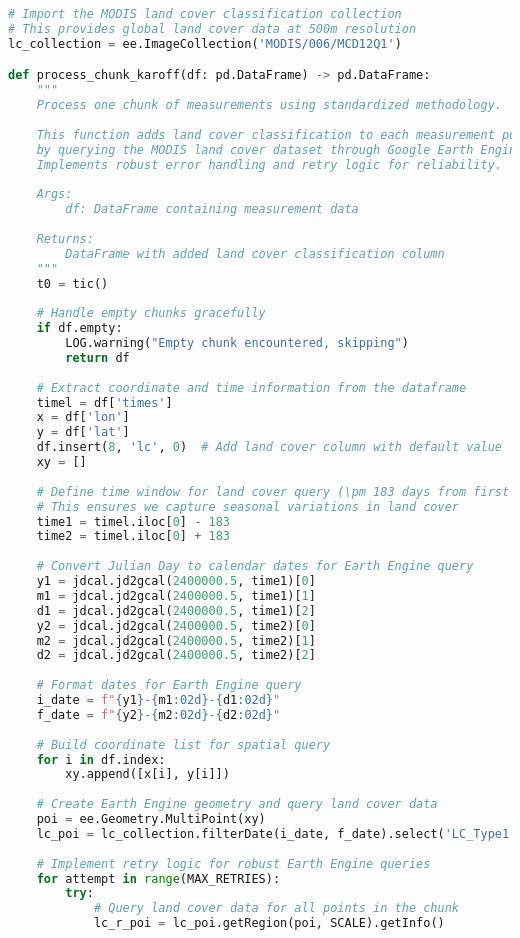 \begin{lstlisting}[language=Python, caption=Land Cover Classification Addition Algorithm, label=alg:step02_add_lc]
# Import the MODIS land cover classification collection
# This provides global land cover data at 500m resolution
lc_collection = ee.ImageCollection('MODIS/006/MCD12Q1')

def process_chunk_karoff(df: pd.DataFrame) -> pd.DataFrame:
    """
    Process one chunk of measurements using standardized methodology.
    
    This function adds land cover classification to each measurement point
    by querying the MODIS land cover dataset through Google Earth Engine.
    Implements robust error handling and retry logic for reliability.
    
    Args:
        df: DataFrame containing measurement data
        
    Returns:
        DataFrame with added land cover classification column
    """
    t0 = tic()
    
    # Handle empty chunks gracefully
    if df.empty:
        LOG.warning("Empty chunk encountered, skipping")
        return df
    
    # Extract coordinate and time information from the dataframe
    timel = df['times']
    x = df['lon']
    y = df['lat']
    df.insert(8, 'lc', 0)  # Add land cover column with default value
    xy = []
    
    # Define time window for land cover query (\pm 183 days from first measurement)
    # This ensures we capture seasonal variations in land cover
    time1 = timel.iloc[0] - 183
    time2 = timel.iloc[0] + 183
    
    # Convert Julian Day to calendar dates for Earth Engine query
    y1 = jdcal.jd2gcal(2400000.5, time1)[0]
    m1 = jdcal.jd2gcal(2400000.5, time1)[1]
    d1 = jdcal.jd2gcal(2400000.5, time1)[2]
    y2 = jdcal.jd2gcal(2400000.5, time2)[0]
    m2 = jdcal.jd2gcal(2400000.5, time2)[1]
    d2 = jdcal.jd2gcal(2400000.5, time2)[2]
    
    # Format dates for Earth Engine query
    i_date = f"{y1}-{m1:02d}-{d1:02d}"
    f_date = f"{y2}-{m2:02d}-{d2:02d}"
    
    # Build coordinate list for spatial query
    for i in df.index:
        xy.append([x[i], y[i]])
    
    # Create Earth Engine geometry and query land cover data
    poi = ee.Geometry.MultiPoint(xy)
    lc_poi = lc_collection.filterDate(i_date, f_date).select('LC_Type1')
    
    # Implement retry logic for robust Earth Engine queries
    for attempt in range(MAX_RETRIES):
        try:
            # Query land cover data for all points in the chunk
            lc_r_poi = lc_poi.getRegion(poi, SCALE).getInfo()
            

\end{lstlisting}

